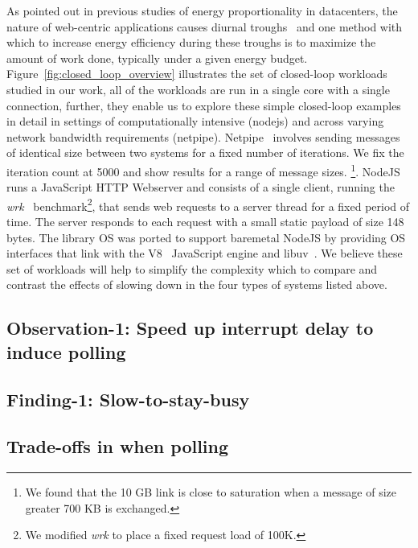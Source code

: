 As pointed out in previous studies of energy proportionality in datacenters, the nature of web-centric applications causes diurnal troughs~\cite{Barroso:2009:DCI:1643608, oldi-study, oldi-pegasus, warehouse-power, energyproportion, WebSearch} and one method with which to increase energy efficiency during these troughs is to maximize the amount of work done, typically under a given energy budget. Figure~\ref{fig:closed_loop_overview} illustrates the set of closed-loop workloads studied in our work, all of the workloads are run in a single core with a single connection, further, they enable us to explore these simple closed-loop examples in detail in settings of computationally intensive (nodejs) and across varying network bandwidth requirements (netpipe). Netpipe~\cite{snell1996netpipe} involves sending messages of identical size between two systems for a fixed number of iterations. We fix the iteration count at 5000 and show results for a range of message sizes. \footnote{We found that the 10 GB link is close to saturation when a message of size greater 700 KB is exchanged.}. NodeJS~\cite{nodejs} runs a JavaScript HTTP Webserver and consists of a single client, running the \textit{wrk}~\cite{wrk} benchmark\footnote{We modified \textit{wrk} to place a fixed request load of 100K.}, that sends web requests to a server thread for a fixed period of time. The server responds to each request with a small static payload of size 148 bytes. The library OS was ported to support baremetal NodeJS by providing OS interfaces that link with the V8~\cite{v8} JavaScript engine and libuv~\cite{libuv}. We believe these set of workloads will help to simplify the complexity which to compare and contrast the effects of slowing down in the four types of systems listed above.

\subsection{Observation-1: Speed up interrupt delay to induce polling}

\subsection{Finding-1: Slow-to-stay-busy}

\subsection{Trade-offs in when polling}
